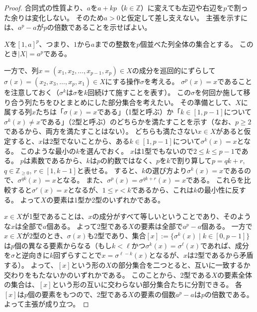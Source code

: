 ﻿\documentclass{ltjsarticle}
\theoremstyle{definition}
\begin{document}
\begin{proof}
    合同式の性質より、$a$を$a + kp$（$k \in \mathbb{Z}$）に変えても左辺や右辺を$p$で割った余りは変化しない。
    そのため$a > 0$と仮定して差し支えない。
    主張を示すには、$a^p - a$が$p$の倍数であることを示せばよい。

    $X$を$[1,a]^p$、つまり、$1$から$a$までの整数を$p$個並べた列全体の集合とする。
    このとき$|X| = a^p$である。

    一方で、列$x = (x_1,x_2,\dots,x_{p-1},x_p) \in X$の成分を巡回的にずらして$\sigma(x) = (x_2,x_3,\dots,x_p,x_1) \in X$にする操作$\sigma$を考える。
    $\sigma^p(x) = x$であることを注意しておく（$\sigma^k$は$\sigma$を$k$回続けて施すことを表す）。
    この$\sigma$を何回か施して移り合う列たちをひとまとめにした部分集合を考えたい。
    その準備として、$X$に属する列$x$たちは「$\sigma(x) = x$である」（1型と呼ぶ）か「$k \in [1,p-1]$について$\sigma^k(x) \neq x$である」（2型と呼ぶ）のどちらかを満たすことを示す（なお、$p \geq 2$であるから、両方を満たすことはない）。
    どちらも満たさない$x \in X$があると仮定すると、$x$は2型でないことから、ある$k \in [1,p-1]$について$\sigma^k(x) = x$となる。
    このような最小の$k$を選んでおく。
    $x$は1型でもないので$2 \leq k \leq p-1$である。
    $p$は素数であるから、$k$は$p$の約数ではなく、$p$を$k$で割り算して$p = qk + r$, $q \in \mathbb{Z}_{\geq 0}$, $r \in [1,k-1]$と表せる。
    すると、$k$の選び方より$\sigma^k(x) = x$であるので、$\sigma^{qk}(x) = x$となる。
    また、$\sigma^p(x) = \sigma^{qk+r}(x) = x$である。
    これらを比較すると$\sigma^r(x) = x$となるが、$1 \leq r < k$であるから、これは$k$の最小性に反する。
    よって$X$の要素は1型か2型のいずれかである。

    $x \in X$が1型であることは、$x$の成分がすべて等しいということであり、そのような$x$は全部で$a$個ある。
    よって2型である$X$の要素は全部で$a^p - a$個ある。
    一方で$x \in X$が2型のとき、$\sigma(x)$も2型であり、集合$[x] := \{ \sigma^k(x) \mid k \in [0,p-1] \}$は$p$個の異なる要素からなる（もし$k < \ell$かつ$\sigma^k(x) = \sigma^{\ell}(x)$であれば、成分を$\sigma$と逆向きに$k$回ずらすことで$x = \sigma^{\ell - k}(x)$となるが、$x$は2型であるから矛盾する）。
    よって、$[x]$という形の$X$の部分集合を二つとると、互いに一致するか交わりをもたないかのいずれかである。
    このことから、2型である$X$の要素全体の集合は、$[x]$という形の互いに交わらない部分集合たちに分割できる。
    各$[x]$は$p$個の要素をもつので、2型である$X$の要素の個数$a^p - a$は$p$の倍数である。
    よって主張が成り立つ。
\end{proof}
\end{document}
